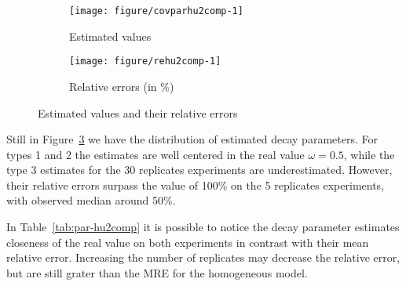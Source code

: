 \begin{figure}[t]
  \begin{subfigure}{\textwidth}
  \centering
\begin{knitrout}
\color{fgcolor}
\texttt{[image: figure/covparhu2comp-1]} 

\end{knitrout}
    \caption{Estimated values} \label{fig:cpest-hu2comp}
  \end{subfigure}
  \begin{subfigure}{\textwidth}
  \centering
\begin{knitrout}
\color{fgcolor}
\texttt{[image: figure/rehu2comp-1]} 

\end{knitrout}
    \caption{Relative errors (in \%) }\label{fig:re-hu2comp}
  \end{subfigure}
  \caption{Estimated values and their relative errors}
  \label{fig:cp-hu2comp}
\end{figure}  

Still in Figure~\ref{fig:cp-hu2comp} we have the distribution of estimated decay parameters. For types 1 and 2 the estimates are well centered in the real value $\omega=0.5$, while the type 3 estimates for the 30 replicates experiments are underestimated. However, their relative errors surpass the value of 100\% on the 5 replicates experiments, with observed median around 50\%. 

In Table~\ref{tab:par-hu2comp} it is possible to notice the decay parameter estimates closeness of the real value on both experiments in contrast with their mean relative error. Increasing the number of replicates may decrease the relative error, but are still grater than the MRE for the homogeneous model. 

